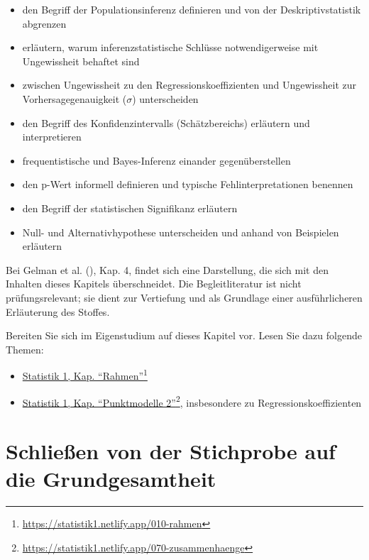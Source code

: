 \documentclass[
  ngerman,
  letterpaper,
  twoside,
  open=any]{scrbook}
\providecommand{\tightlist}{%
  \setlength{\itemsep}{0pt}\setlength{\parskip}{0pt}}\usepackage{longtable,booktabs,array}
\theoremstyle{definition}
\theoremstyle{plain}
\theoremstyle{definition}
\theoremstyle{definition}
\theoremstyle{remark}
\begin{document}
\begin{itemize}
\tightlist
\item
  den Begriff der Populationsinferenz definieren und von der
  Deskriptivstatistik abgrenzen
\item
  erläutern, warum inferenzstatistische Schlüsse notwendigerweise mit
  Ungewissheit behaftet sind
\item
  zwischen Ungewissheit zu den Regressionskoeffizienten und Ungewissheit
  zur Vorhersagegenauigkeit (\(\sigma\)) unterscheiden
\item
  den Begriff des Konfidenzintervalls (Schätzbereichs) erläutern und
  interpretieren
\item
  frequentistische und Bayes-Inferenz einander gegenüberstellen
\item
  den p-Wert informell definieren und typische Fehlinterpretationen
  benennen
\item
  den Begriff der statistischen Signifikanz erläutern
\item
  Null- und Alternativhypothese unterscheiden und anhand von Beispielen
  erläutern
\end{itemize}

Bei Gelman et al. (), Kap. 4, findet sich
eine Darstellung, die sich mit den Inhalten dieses Kapitels
überschneidet. Die Begleitliteratur ist nicht prüfungsrelevant; sie
dient zur Vertiefung und als Grundlage einer ausführlicheren Erläuterung
des Stoffes.

Bereiten Sie sich im Eigenstudium auf dieses Kapitel vor. Lesen Sie dazu
folgende Themen:

\begin{itemize}
\tightlist
\item
  \href{https://statistik1.netlify.app/010-rahmen}{Statistik 1, Kap.
  \enquote{Rahmen}}\footnote{\url{https://statistik1.netlify.app/010-rahmen}}
\item
  \href{https://statistik1.netlify.app/070-zusammenhaenge}{Statistik 1,
  Kap. \enquote{Punktmodelle 2}}\footnote{\url{https://statistik1.netlify.app/070-zusammenhaenge}},
  insbesondere zu Regressionskoeffizienten
\end{itemize}

\section{Schließen von der Stichprobe auf die
Grundgesamtheit}\label{schlieuxdfen-von-der-stichprobe-auf-die-grundgesamtheit}
\end{document}
